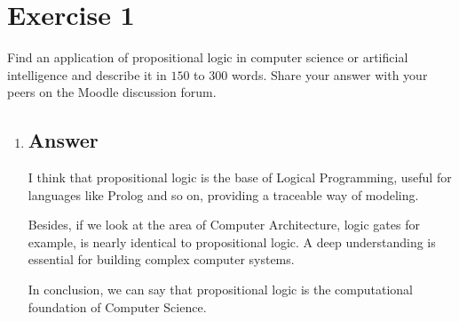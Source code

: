 \documentclass[12pt]{article}
\begin{document}
	
	\section*{Exercise 1}
	
	\noindent Find an application of propositional logic in computer science or artificial intelligence and describe it in $150$ to $300$ words. Share your answer with your peers on the Moodle discussion forum.
	
	\bigskip
	
	\begin{enumerate}[label={},leftmargin=0in]\item
		\subsection*{Answer}
		
			I think that propositional logic is the base of Logical Programming, useful for languages like Prolog and so on, providing a traceable way of modeling.
			
			Besides, if we look at the area of Computer Architecture, logic gates for example, is nearly identical to propositional logic. A deep understanding is essential for building complex computer systems.
			
			In conclusion, we can say that propositional logic is the computational foundation of Computer Science.
			
	\end{enumerate}
	
\end{document}
